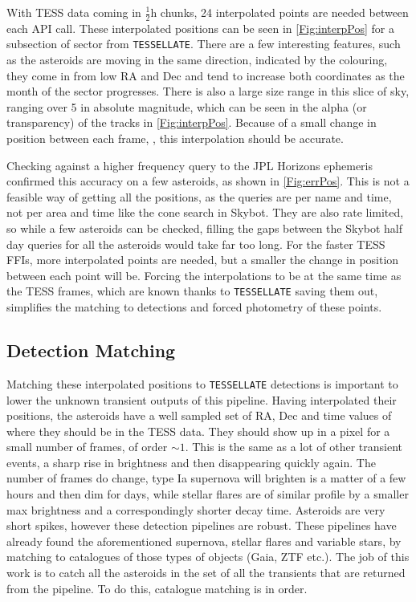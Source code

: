 \documentclass{UCreport}
\begin{document}
With TESS data coming in $\frac12\unit{\hour}$ chunks, 24 interpolated points are needed between each API call.
These interpolated positions can be seen in \autoref{Fig:interpPos} for a subsection of sector from \texttt{TESSELLATE}.
There are a few interesting features, such as the asteroids are moving in the same direction, indicated by the colouring, they come in from low RA and Dec and tend to increase both coordinates as the month of the sector progresses.
There is also a large size range in this slice of sky, ranging over \qty{5}{\mag} in absolute magnitude, which can be seen in the alpha (or transparency) of the tracks in \autoref{Fig:interpPos}.
Because of a small change in position between each frame, \citep[$\sim \qty{1}{\px}$ per frame][]{Pal2018}, this interpolation should be accurate.

Checking against a higher frequency query to the JPL Horizons ephemeris  confirmed this accuracy on a few asteroids, as shown in \autoref{Fig:errPos}.
This is not a feasible way of getting all the positions, as the queries are per name and time, not per area and time like the cone search in Skybot.
They are also rate limited, so while a few asteroids can be checked, filling the gaps between the Skybot half day queries for all the asteroids would take far too long.
For the faster TESS FFIs, more interpolated points are needed, but a smaller the change in position between each point will be.
Forcing the interpolations to be at the same time as the TESS frames, which are known thanks to \texttt{TESSELLATE} saving them out, simplifies the matching to detections and forced photometry of these points.


\subsection{Detection Matching}\label{SubSec:Match}

Matching these interpolated positions to \texttt{TESSELLATE} detections is important to lower the unknown transient outputs of this pipeline.
Having interpolated their positions, the asteroids have a well sampled set of RA, Dec and time values of where they should be in the TESS data.
They should show up in a pixel for a small number of frames, of order $\sim1$.
This is the same as a lot of other transient events, a sharp rise in brightness and then disappearing quickly again.
The number of frames do change, type Ia supernova will brighten is a matter of a few hours and then dim for days, while stellar flares are of similar profile by a smaller max brightness and a correspondingly shorter decay time.
Asteroids are very short spikes, however these detection pipelines are robust. %
These pipelines have already found the aforementioned supernova, stellar flares and variable stars, by matching to catalogues of those types of objects (Gaia, ZTF etc.).
The job of this work is to catch all the asteroids in the set of all the transients that are returned from the pipeline.
To do this, catalogue matching is in order.
\end{document}
